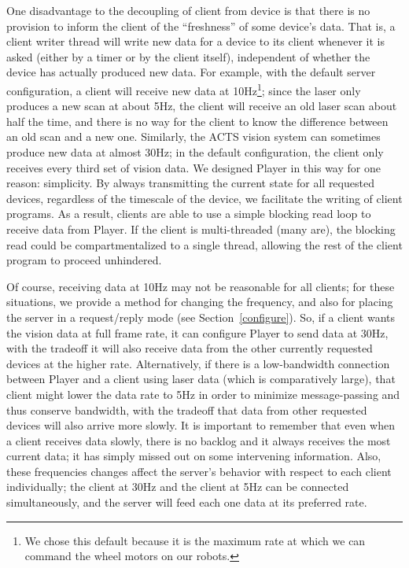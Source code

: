 \documentclass[11pt]{article}
\begin{document}
One disadvantage to the decoupling of client from device is that
there is no provision to inform the client of the ``freshness'' of some
device's data.  
That is, a client writer thread will write new data for a device to its 
client whenever it is asked (either by a timer or by the client itself),
independent of whether the device has actually produced new data.  For
example, with the default server configuration, a client will receive
new data at 10Hz\footnote{We chose this default because it is the maximum rate 
at which we can command the wheel motors on our robots.}; since the laser 
only produces a new scan at about 5Hz,
the client will receive an old laser scan about half the time, and there
is no way for the client to know the difference between an old scan
and a new one.  Similarly, the ACTS vision system can sometimes
produce new data at almost 30Hz; in the default configuration, the client
only receives every third set of vision data.  We designed Player in
this way for one reason: simplicity.  By always transmitting the current
state for all requested devices, regardless of the timescale of the
device, we facilitate the writing of client programs.  As a result,
clients are able to use a simple blocking read loop to receive data 
from Player.  If the client is multi-threaded (many are),
the blocking read could be compartmentalized to a single thread, 
allowing the rest of the client program to proceed unhindered.

Of course, receiving data at 10Hz may
not be reasonable for all clients; for these situations, we provide 
a method for changing the frequency, and also for placing the server
in a request/reply mode (see Section~\ref{configure}).  So,
if a client wants the vision data at full frame rate, it can configure
Player to send data at 30Hz, with the tradeoff it will also
receive data from the other currently requested devices at the higher
rate.   Alternatively, if there is a low-bandwidth connection 
between Player and a client using
laser data (which is comparatively large), that client might lower 
the data rate to 5Hz in order
to minimize message-passing and thus conserve bandwidth, with the tradeoff
that data from other requested devices will also arrive more slowly.
It is important to remember that even when a client receives data
slowly, there is no backlog and it always receives the most current data; 
it has simply missed out on some intervening information.  Also,
these frequencies changes affect the server's behavior with respect
to each client individually; the client at 30Hz and the client at 5Hz 
can be connected simultaneously, and the server will feed each one data
at its preferred rate.
\end{document}
